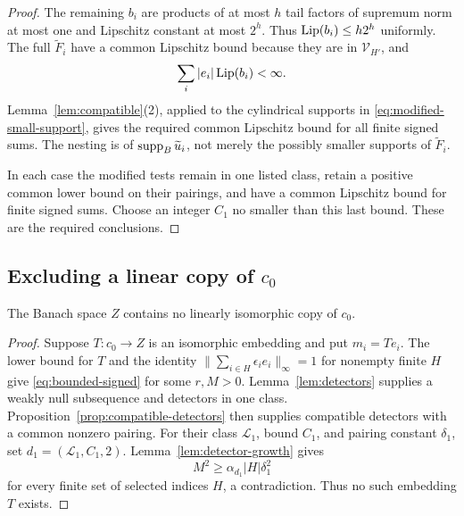 \begin{proof}
The remaining \(b_i\) are products of at most \(h\) tail factors of
supremum norm at most one and Lipschitz constant at most \(2^h\).
Thus \(\operatorname{Lip}(b_i)\leq h2^h\) uniformly. The full
\(\widetilde F_i\) have a common Lipschitz bound because they are
in \(\mathcal V_{H'}\), and
\[
                   \sum_i|e_i|\operatorname{Lip}(b_i)<\infty.
\]
Lemma~\ref{lem:compatible}(2), applied to the cylindrical supports
in \eqref{eq:modified-small-support}, gives the required common Lipschitz bound for all finite
signed sums. The nesting is of \(\operatorname{supp}_B\widetilde u_i\), not merely
the possibly smaller supports of \(\widetilde F_i\).

In each case the modified tests remain in one listed class, retain a
positive common lower bound on their pairings, and have a common
Lipschitz bound for finite signed sums. Choose an integer \(C_1\)
no smaller than this last bound. These are the required conclusions.
\end{proof}

\subsection{Excluding a linear copy of \texorpdfstring{\(c_0\)}{c0}}

\begin{proposition}\label{prop:no-c0}
The Banach space \(Z\) contains no linearly isomorphic copy of \(c_0\).
\end{proposition}

\begin{proof}
Suppose \(T:c_0\to Z\) is an isomorphic embedding and put \(m_i=Te_i\).
The lower bound for \(T\) and the identity
\(\|\sum_{i\in H}\epsilon_i e_i\|_\infty=1\) for nonempty finite
\(H\) give \eqref{eq:bounded-signed} for some \(r,M>0\).
Lemma~\ref{lem:detectors} supplies a weakly null subsequence and
detectors in one class. Proposition~\ref{prop:compatible-detectors}
then supplies compatible detectors with a common nonzero pairing.
For their class \(\mathcal L_1\), bound \(C_1\), and pairing
constant \(\delta_1\), set \(d_1=(\mathcal L_1,C_1,2)\).
Lemma~\ref{lem:detector-growth} gives
\[
                  M^2\geq\alpha_{d_1}|H|\delta_1^2
\]
for every finite set of selected indices \(H\), a contradiction.
Thus no such embedding \(T\) exists.
\end{proof}
